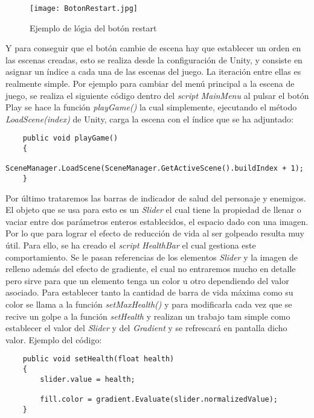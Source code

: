 \begin{figure}[H]
    \centering
    \texttt{[image: BotonRestart.jpg]}
    \caption{Ejemplo de lógia del botón restart }
\end{figure}

Y para conseguir que el botón cambie de escena hay que establecer un orden en las escenas creadas, esto se realiza desde la configuración de Unity, y consiste en asignar un índice a cada una de las escenas del juego. La iteración entre ellas es realmente simple. Por ejemplo para cambiar del menú principal a la escena de juego, se realiza el siguiente código dentro del \textit{script} \textit{MainMenu} al pulsar el botón Play se hace la función \textit{playGame()} la cual simplemente, ejecutando el método \textit{LoadScene(index)} de Unity, carga la escena con el índice que se ha adjuntado:

\begin{lstlisting}
    public void playGame()
    {
        SceneManager.LoadScene(SceneManager.GetActiveScene().buildIndex + 1);
    }
\end{lstlisting}

Por último trataremos las barras de indicador de salud del personaje y enemigos. El objeto que se usa para esto es un  \textit{Slider} el cual tiene la propiedad de llenar o vaciar entre dos parámetros enteros establecidos, el espacio dado con una imagen. Por lo que para lograr el efecto de reducción de vida al ser golpeado resulta muy útil. Para ello, se ha creado el \textit{script} \textit{HealthBar} el cual gestiona este comportamiento. Se le pasan referencias de los elementos \textit{Slider} y la imagen de relleno además del efecto de gradiente, el cual no entraremos mucho en detalle pero sirve para que un elemento tenga un color u otro dependiendo del valor asociado. Para establecer tanto la cantidad de barra de vida máxima como su color se llama a la función \textit{setMaxHealth()} y para modificarla cada vez que se recive un golpe a la función \textit{setHealth} y realizan un trabajo tam simple como establecer el valor del \textit{Slider} y del \textit{Gradient} y se refrescará en pantalla dicho valor. Ejemplo del código: 

\begin{lstlisting}
    public void setHealth(float health)
    {
        slider.value = health;

        fill.color = gradient.Evaluate(slider.normalizedValue);
    }
\end{lstlisting}

